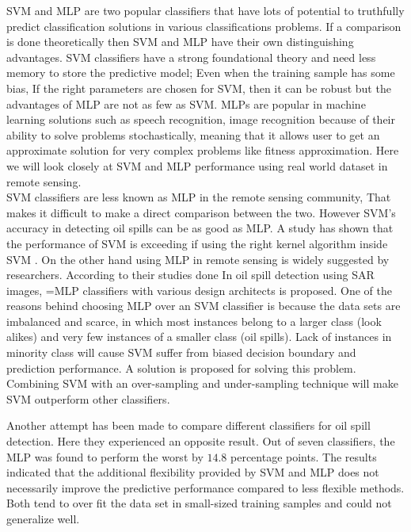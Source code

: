 SVM and MLP are two popular classifiers that have lots of potential to truthfully predict classification solutions in various classifications problems\cite{Moavenian20103088,Zanaty2012177}. If a comparison is done theoretically then SVM and MLP have their own distinguishing advantages. SVM classifiers have a strong foundational theory and need less memory to store the predictive model; Even when the training sample has some bias, If the right parameters are chosen for SVM, then it can be robust\cite{auria2008support} but the advantages of MLP are not as few as SVM. MLPs are popular in machine learning solutions such as speech recognition, image recognition because of their ability to solve problems stochastically, meaning that it allows user to get an approximate solution for very complex problems like fitness approximation\cite{jin2005neural}. Here we will look closely at SVM and MLP performance using real world dataset in remote sensing.\\

SVM classifiers are less known as MLP in the remote sensing community, That makes it difficult to make a direct comparison between the two. However SVM's accuracy in detecting oil spills can be as good as MLP. A study has shown that the performance of SVM is exceeding if using the right kernel algorithm inside SVM \cite{liu2006boosting}. On the other hand using MLP in remote sensing is widely suggested by researchers\cite{Mera201472,Brekke200595,fingas2014review}. According to their studies done In oil spill detection using SAR images, =MLP classifiers with various design architects is proposed. One of the reasons behind choosing MLP over an SVM classifier is because the data sets are imbalanced and scarce, in which most instances belong to a larger class (look alikes) and very few instances of a smaller class (oil spills). Lack of instances in minority class will cause SVM suffer from biased decision boundary and prediction performance. A solution is proposed for solving this problem. Combining SVM with an over-sampling and under-sampling technique will make SVM outperform other classifiers\cite{liu2006boosting}.


Another attempt has been made to compare different classifiers for oil spill detection.\cite{Xu201414} Here they experienced an opposite result. Out of seven classifiers, the MLP was found to perform the worst by $14.8$ percentage points. The results indicated that the additional flexibility provided by SVM and MLP does not necessarily improve the predictive performance compared to less flexible methods. Both tend to over fit the data set in small-sized training samples and could not generalize well. 